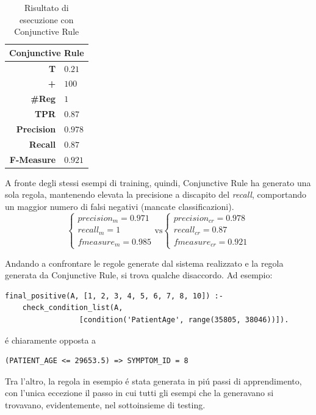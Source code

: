 \documentclass[preprint]{acm_proc_article-sp}
\begin{document}
\begin{table}[h]
\centering
\begin{tabular}{|r|l|} \hline
\multicolumn{2}{|c|}{\textbf{Conjunctive Rule}} \\ \hline \hline 
\textbf{T} & $0.21$ \\ \hline
\textbf{+} & $100$ \\ \hline
\textbf{\#Reg} & $1$\\ \hline
\textbf{TPR} & $0.87$ \\ \hline
\textbf{Precision} & $0.978$ \\ \hline
\textbf{Recall} & $0.87$ \\  \hline
\textbf{F-Measure} & $0.921$ \\
\hline\end{tabular}
\caption{Risultato di esecuzione con Conjunctive Rule}
\label{table:risultati-conjunctive-rule}
\end{table}

A fronte degli stessi esempi di training, quindi, Conjunctive Rule ha generato una sola regola, mantenendo elevata la precisione a discapito del \textit{recall}, comportando un maggior numero di falsi negativi (mancate classificazioni).
\[
\begin{cases}
precision_m = 0.971 \\
recall_m = 1 \\
fmeasure_m = 0.985
\end{cases}
\mbox{vs}
\begin{cases}
precision_{cr} = 0.978 \\
recall_{cr} = 0.87 \\
fmeasure_{cr} = 0.921
\end{cases}
\]

Andando a confrontare le regole generate dal sistema realizzato e la regola generata da Conjunctive Rule, si trova qualche disaccordo. Ad esempio:
\begin{verbatim}
final_positive(A, [1, 2, 3, 4, 5, 6, 7, 8, 10]) :-
	check_condition_list(A,
			     [condition('PatientAge', range(35805, 38046))]).
\end{verbatim}
\'e chiaramente opposta a
\begin{verbatim}
(PATIENT_AGE <= 29653.5) => SYMPTOM_ID = 8
\end{verbatim}

Tra l'altro, la regola in esempio \'e stata generata in pi\'u passi di apprendimento, con l'unica eccezione il passo in cui tutti gli esempi che la generavano si trovavano, evidentemente, nel sottoinsieme di testing.
\end{document}
